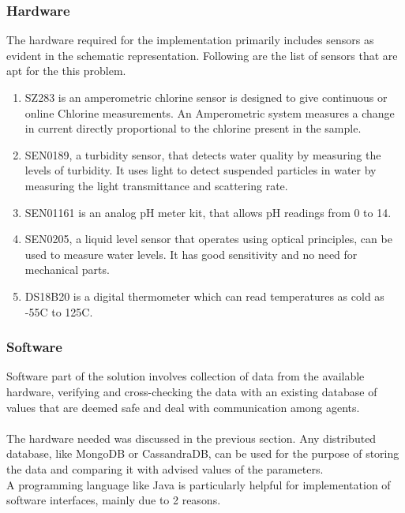 \documentclass[12pt]{article}
\begin{document}
    \subsubsection{Hardware}
    The hardware required for the implementation primarily includes sensors as evident in the schematic representation.
    Following are the list of sensors that are apt for the this problem.
     \begin{enumerate}
        \item SZ283 is an amperometric chlorine sensor is designed to give continuous or online Chlorine measurements. An Amperometric system measures a change in current directly proportional to the chlorine present in the sample. \cite{chlorine}
        \item SEN0189, a turbidity sensor, that detects water quality by measuring the levels of turbidity. It uses light to detect suspended particles in water by measuring the light transmittance and scattering rate. \cite{turbidity}
        \item SEN01161 is an analog pH meter kit, that allows pH readings from 0 to 14. \cite{pH}
        \item SEN0205, a liquid level sensor that operates using optical principles, can be used to measure water levels. It has good sensitivity and no need for mechanical parts. \cite{level}
        \item DS18B20 is a digital thermometer which can read temperatures as cold as -55\degree C to 125\degree C. \cite{thermo}
         
     \end{enumerate}
    
    \subsubsection{Software}
    Software part of the solution involves collection of data from the available hardware, verifying and cross-checking the data with an existing database of values that are deemed safe and deal with communication among agents.\\
    \\The hardware needed was discussed in the previous section. Any distributed database, like MongoDB or CassandraDB, can be used for the purpose of storing the data and comparing it with advised values of the parameters.\\
    A programming language like Java is particularly helpful for implementation of software interfaces, mainly due to 2 reasons.
    
\end{document}

